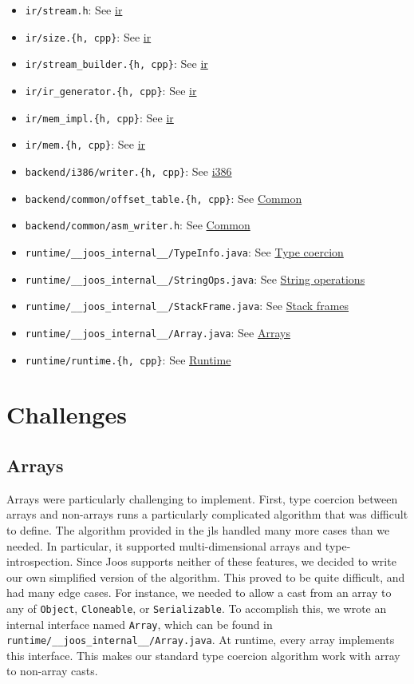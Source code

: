 \documentclass[12pt, titlepage]{article}
\newcommand{\z}[1]{\texttt{#1}}
\begin{document}
\begin{itemize}
  \item \z{ir/stream.h}: See \hyperref[subsec:ir]{\acf{ir}}
  \item \z{ir/size.\{h, cpp\}}: See \hyperref[subsec:ir]{\acf{ir}}
  \item \z{ir/stream\_builder.\{h, cpp\}}: See \hyperref[subsec:ir]{\acf{ir}}
  \item \z{ir/ir\_generator.\{h, cpp\}}: See \hyperref[subsec:ir]{\acf{ir}}
  \item \z{ir/mem\_impl.\{h, cpp\}}: See \hyperref[subsec:ir]{\acf{ir}}
  \item \z{ir/mem.\{h, cpp\}}: See \hyperref[subsec:ir]{\acf{ir}}
  \item \z{backend/i386/writer.\{h, cpp\}}: See \hyperref[subsubsec:i386]{i386}
  \item \z{backend/common/offset\_table.\{h, cpp\}}: See \hyperref[subsubsec:common]{Common}
  \item \z{backend/common/asm\_writer.h}: See \hyperref[subsubsec:common]{Common}
  \item \z{runtime/\_\_joos\_internal\_\_/TypeInfo.java}: See \hyperref[subsubsec:co]{Type coercion}
  \item \z{runtime/\_\_joos\_internal\_\_/StringOps.java}: See \hyperref[subsubsec:strops]{String operations}
  \item \z{runtime/\_\_joos\_internal\_\_/StackFrame.java}: See \hyperref[subsubsec:stacks]{Stack frames}
  \item \z{runtime/\_\_joos\_internal\_\_/Array.java}: See \hyperref[subsec:arrays]{Arrays}
  \item \z{runtime/runtime.\{h, cpp\}}: See \hyperref[subsec:runtime]{Runtime}
\end{itemize}

\section{Challenges}
\subsection{Arrays}\label{subsec:arrays}
Arrays were particularly challenging to implement. First, type coercion between
arrays and non-arrays runs a particularly complicated algorithm that was
difficult to define. The algorithm provided in the \ac{jls} handled many more
cases than we needed. In particular, it supported multi-dimensional arrays and
type-introspection. Since Joos supports neither of these features, we decided
to write our own simplified version of the algorithm. This proved to be quite
difficult, and had many edge cases. For instance, we needed to allow a cast
from an array to any of \z{Object}, \z{Cloneable}, or \z{Serializable}. To
accomplish this, we wrote an internal interface named \z{Array}, which can be
found in \\\z{runtime/\_\_joos\_internal\_\_/Array.java}. At runtime, every
array implements this interface. This makes our standard type coercion
algorithm work with array to non-array casts.
\end{document}
